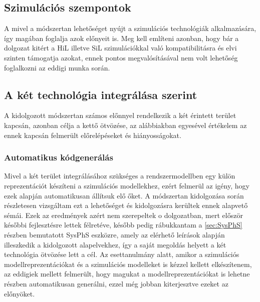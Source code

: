        \subsection{Szimulációs szempontok}
        A mivel a módszertan lehetőséget nyújt a szimulációs technológiák alkalmazására, így magában foglalja azok előnyeit is.
        Meg kell említeni azonban, hogy bár a dolgozat kitért a HiL illetve SiL szimulációkkal való kompatibilitásra és elvi szinten támogatja azokat, ennek pontos megvalósításával nem volt lehetőség foglalkozni az eddigi munka során.

        \subsection{A két technológia integrálása szerint}
        A kidolgozott módszertan számos előnnyel rendelkezik a két érintett terület kapcsán, azonban célja a kettő ötvözése, az alábbiakban egyesével értékelem az ennek kapcsán felmerült előrelépéseket és hiányosságokat.

            \subsubsection{Automatikus kódgenerálás}
            Mivel a két terület integrálásához szükséges a rendszermodellben egy külön reprezentációt készíteni a szimulációs modellekhez, ezért felmerül az igény, hogy ezek alapján automatikusan állítsuk elő őket.
            A módszertan kidolgozása során részletesen vizsgáltam ezt a lehetőséget és kidolgozásra kerültek ennek alapvető sémái. Ezek az eredmények azért nem szerepeltek o dolgozatban, mert először későbbi fejlesztésre lettek félretéve, később pedig rábukkantam a \ref{sec:SysPhS} részben bemutatott SysPhS
            eszközre, amely az elérhető leírások alapján illeszkedik a kidolgozott alapelvekhez, így a saját megoldás helyett a két technológia ötvözése lett a cél.
            Az esettanulmány alatt, amikor a szimulációs modellreprezentációkat és a szimulációs modelleket is kézzel kellett elkészítenem, az eddigiek mellett felmerült, hogy magukat a modellreprezentációkat is lehetne részben automatikusan generálni, ezzel még jobban kiterjesztve ezeket az előnyöket.


